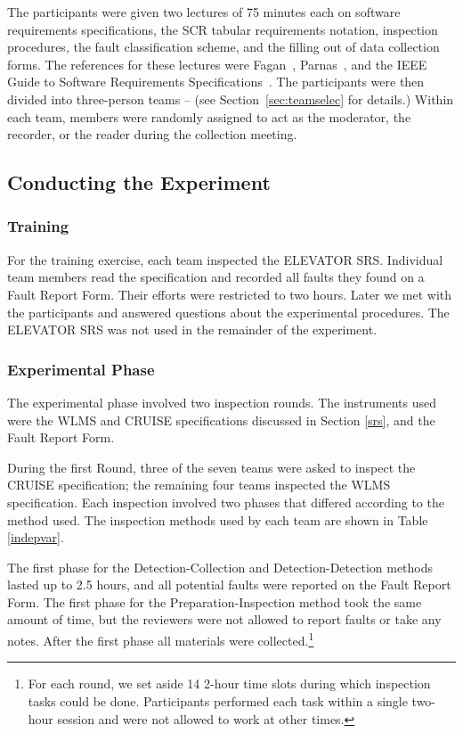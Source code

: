 The participants were given two lectures of 75 minutes each on  
software requirements specifications,
the SCR tabular requirements notation,
inspection procedures, the fault classification scheme,
and the filling out of data collection forms. The references
for these lectures were Fagan~\cite{fagan.1976}, 
Parnas~\cite{parnas.1985},
and the IEEE Guide to Software Requirements 
Specifications~\cite{ieee.1984}.
The participants were then divided into 
three-person teams -- (see Section~\ref{sec:teamselec} 
for details.) Within each team, members were randomly assigned 
to act as the moderator, the recorder, or the reader during the
collection meeting.

\subsection{Conducting the Experiment}
\label{conducting}

\subsubsection{Training}

For the training exercise, each team inspected  
the ELEVATOR SRS. Individual team members read the specification 
and 
recorded all faults they found on a Fault Report Form. 
Their efforts were restricted to two hours. Later we met with 
the participants and answered questions about the experimental
procedures. The ELEVATOR SRS was not used in the remainder of the experiment.



\subsubsection{Experimental Phase}
\label{sec:experm_results}
The experimental phase involved two inspection rounds. The instruments used 
were the WLMS and CRUISE specifications discussed in Section 
\ref{srs}, and the Fault Report Form. 

During the first Round, three of the seven teams were asked to inspect 
the CRUISE specification; the remaining four teams inspected the 
WLMS specification. Each inspection involved two phases that  
differed according to the method used.  The inspection methods 
used by each team are shown in Table \ref{indepvar}.

The first phase for the Detection-Collection and Detection-Detection 
methods lasted up to 2.5 
hours, and all potential faults were reported on the Fault Report Form. 
The first phase for the Preparation-Inspection
method took the same amount of time, but 
the reviewers were not allowed to report faults or take any notes. 
After the first phase all materials were collected.\footnote{
For each round, we set aside 14 2-hour time slots during which 
inspection tasks could be done.  Participants performed each task 
within a single two-hour session and were not allowed to work at 
other times.}

